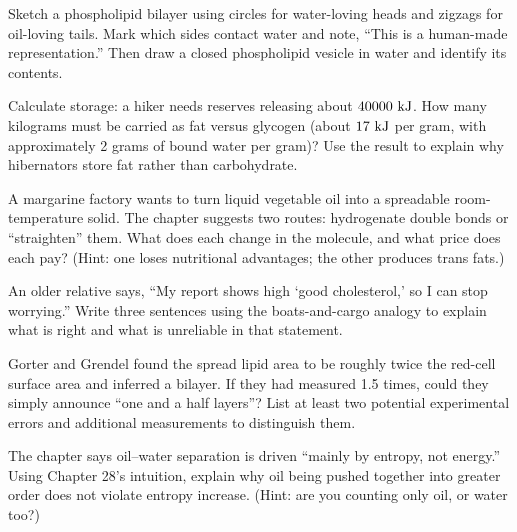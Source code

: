 \begin{sikaoti}
\item Sketch a phospholipid bilayer using circles for water-loving heads and zigzags for oil-loving tails. Mark which sides contact water and note, ``This is a human-made representation.'' Then draw a closed phospholipid vesicle in water and identify its contents.
\item Calculate storage: a hiker needs reserves releasing about $40000\ \mathrm{kJ}$. How many kilograms must be carried as fat versus glycogen (about $17\ \mathrm{kJ}$ per gram, with approximately 2 grams of bound water per gram)? Use the result to explain why hibernators store fat rather than carbohydrate.
\item A margarine factory wants to turn liquid vegetable oil into a spreadable room-temperature solid. The chapter suggests two routes: hydrogenate double bonds or ``straighten'' them. What does each change in the molecule, and what price does each pay? (Hint: one loses nutritional advantages; the other produces trans fats.)
\item An older relative says, ``My report shows high `good cholesterol,' so I can stop worrying.'' Write three sentences using the boats-and-cargo analogy to explain what is right and what is unreliable in that statement.
\item Gorter and Grendel found the spread lipid area to be roughly twice the red-cell surface area and inferred a bilayer. If they had measured 1.5 times, could they simply announce ``one and a half layers''? List at least two potential experimental errors and additional measurements to distinguish them.
\item The chapter says oil--water separation is driven ``mainly by entropy, not energy.'' Using Chapter 28's intuition, explain why oil being pushed together into greater order does not violate entropy increase. (Hint: are you counting only oil, or water too?)
\end{sikaoti}

